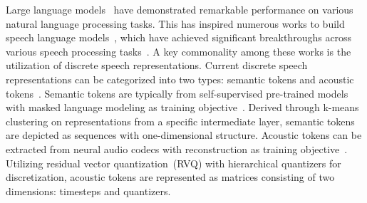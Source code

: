 Large language models~\citep{openai2023gpt4, touvron2023llama} have demonstrated remarkable performance on various natural language processing tasks. This has inspired numerous works to build speech language models~\citep{borsos2022audiolm}, which have achieved significant breakthroughs across various speech processing tasks~\citep{wang2023neural,zhang2023speechgpt, rubenstein2023audiopalm, dong2023polyvoice}. A key commonality among these works is the utilization of discrete speech representations.
Current discrete speech representations can be categorized into two types: semantic tokens and acoustic tokens~\citep{borsos2022audiolm}. Semantic tokens are typically from self-supervised pre-trained models with masked language modeling as training objective~\citep{hsu2021hubert, baevski2020wav2vec, chung2021w2vbert}. Derived through k-means clustering on representations from a specific intermediate layer, semantic tokens are depicted as sequences with one-dimensional structure.
Acoustic tokens can be extracted from neural audio codecs with reconstruction as training objective~\citep{zeghidour2021soundstream, défossez2022high}. 
Utilizing residual vector quantization~(RVQ) with hierarchical quantizers for discretization, acoustic tokens are represented as matrices consisting of two dimensions: timesteps and quantizers.

